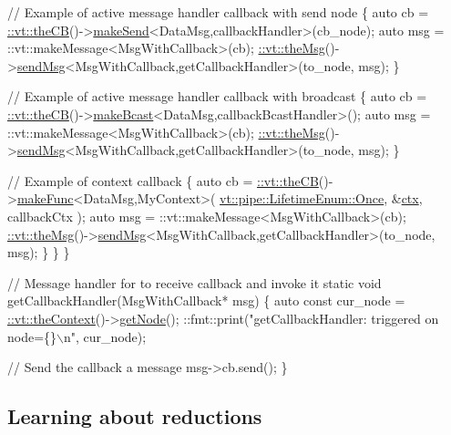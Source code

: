 \begin{DoxyCodeInclude}
    \textcolor{comment}{// Example of active message handler callback with send node}
    \{
      \textcolor{keyword}{auto} cb = \hyperlink{namespacevt_a673b109e94c7bca58313504c83e1da94}{::vt::theCB}()->\hyperlink{structvt_1_1pipe_1_1_pipe_manager_a73583be6260418b13ee66e56cdade2da}{makeSend}<DataMsg,callbackHandler>(cb\_node);
      \textcolor{keyword}{auto} msg = ::vt::makeMessage<MsgWithCallback>(cb);
      \hyperlink{namespacevt_aeafd31f866aeb4dc6fc2f6ee97136350}{::vt::theMsg}()->\hyperlink{group__preregister_ga0162a39473e7f9b490a79a7983d949ac}{sendMsg}<MsgWithCallback,getCallbackHandler>(to\_node, msg);
    \}

    \textcolor{comment}{// Example of active message handler callback with broadcast}
    \{
      \textcolor{keyword}{auto} cb = \hyperlink{namespacevt_a673b109e94c7bca58313504c83e1da94}{::vt::theCB}()->\hyperlink{structvt_1_1pipe_1_1_pipe_manager_a2ea6bd5ea3e001662681b1e5a1971e9d}{makeBcast}<DataMsg,callbackBcastHandler>();
      \textcolor{keyword}{auto} msg = ::vt::makeMessage<MsgWithCallback>(cb);
      \hyperlink{namespacevt_aeafd31f866aeb4dc6fc2f6ee97136350}{::vt::theMsg}()->\hyperlink{group__preregister_ga0162a39473e7f9b490a79a7983d949ac}{sendMsg}<MsgWithCallback,getCallbackHandler>(to\_node, msg);
    \}

    \textcolor{comment}{// Example of context callback}
    \{
      \textcolor{keyword}{auto} cb = \hyperlink{namespacevt_a673b109e94c7bca58313504c83e1da94}{::vt::theCB}()->\hyperlink{structvt_1_1pipe_1_1_pipe_manager_a9ceec59c887d0fa1498b931c788962f6}{makeFunc}<DataMsg,MyContext>(
        \hyperlink{namespacevt_1_1pipe_acb42b284378c0fdac1d7c6335dc26f58ae1a9dc9f23534e63de9df0d540ac1611}{vt::pipe::LifetimeEnum::Once}, &\hyperlink{namespacevt_1_1config_a0551245b6b893932b95aaf8eac94eed1}{ctx}, callbackCtx
      );
      \textcolor{keyword}{auto} msg = ::vt::makeMessage<MsgWithCallback>(cb);
      \hyperlink{namespacevt_aeafd31f866aeb4dc6fc2f6ee97136350}{::vt::theMsg}()->\hyperlink{group__preregister_ga0162a39473e7f9b490a79a7983d949ac}{sendMsg}<MsgWithCallback,getCallbackHandler>(to\_node, msg);
    \}
  \}
\}

\textcolor{comment}{// Message handler for to receive callback and invoke it}
\textcolor{keyword}{static} \textcolor{keywordtype}{void} getCallbackHandler(MsgWithCallback* msg) \{
  \textcolor{keyword}{auto} \textcolor{keyword}{const} cur\_node = \hyperlink{namespacevt_a26551fe0e6e6a1371111df5b12c7e92c}{::vt::theContext}()->\hyperlink{structvt_1_1ctx_1_1_context_a0d52c263ce8516546a67443d9a86fa5f}{getNode}();
  ::fmt::print(\textcolor{stringliteral}{"getCallbackHandler: triggered on node=\{\}\(\backslash\)n"}, cur\_node);

  \textcolor{comment}{// Send the callback a message}
  msg->cb.send();
\}
\end{DoxyCodeInclude}
\hypertarget{tutorial-1h}{}\subsection{Learning about reductions}\label{tutorial-1h}


